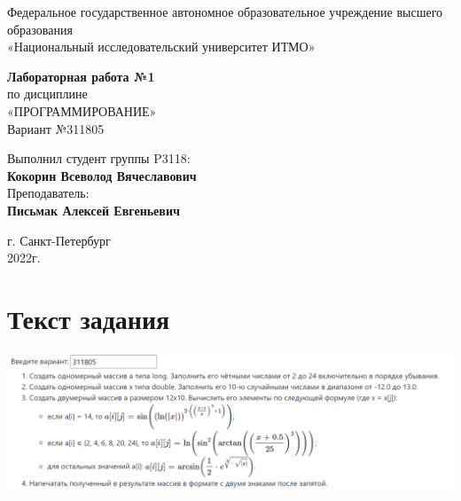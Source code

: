 \documentclass[12pt,onecolumn]{article}
\begin{document}
\begin{center}
    Федеральное государственное автономное образовательное учреждение высшего образования\\
	«Национальный исследовательский университет ИТМО»
\end{center}
\vspace{1cm}


\begin{center}
    \large \textbf{Лабораторная работа №1}\\
    по дисциплине\\
    «ПРОГРАММИРОВАНИЕ»\\
	\vspace{1cm}
    Вариант №311805\\
\end{center}

\vspace{10cm}
\begin{flushright}
  Выполнил студент  группы P3118: \\
  \textbf{Кокорин Всеволод Вячеславович}\\
  Преподаватель: \\
  \textbf{Письмак Алексей Евгеньевич}\\
\end{flushright}

\vspace{5cm}
\begin{center}
    г. Санкт-Петербург\\
    2022г.
\end{center}
\newpage
\tableofcontents
\newpage
\section{Текст задания}
\includegraphics[width=\columnwidth]{img/task.png}

\newpage
\end{document}
